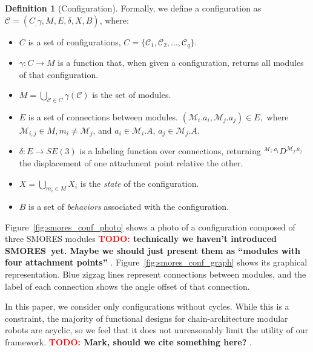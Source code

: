 \documentclass[conference]{IEEEtran}
\theoremstyle{definition}
\newtheorem{definition}{Definition}[section]
\newcommand{\TODO}[1]{ {\bf \textcolor{red}{TODO:} #1 }}
\begin{document}
\begin{definition}[Configuration]
Formally, we define a configuration as $\mathcal{C}=(C_, \gamma, M, E, \delta,
X, B)$, where:
\begin{itemize}
\item $C$ is a set of configurations, $C=\{\mathcal{C}_{1}, \mathcal{C}_{2}, ..., \mathcal{C}_{q}\}$.
\item $\gamma: C \rightarrow M$ is a function that, when given a configuration, returns all modules of that configuration.
\item \( M=\bigcup_{\mathcal{C}\in C}{\gamma(\mathcal{C})} \) is the set of modules.
\item $E$ is a set of connections between modules. $(\mathcal{M}_i.a_i, \mathcal{M}_j.a_j)\in E,$ where $\mathcal{M}_{i,j} \in M, m_i \neq \mathcal{M}_j$, and $a_i\in \mathcal{M}_i.A$, $a_j\in \mathcal{M}_j.A$.
\item $\delta: E \rightarrow SE(3)$ is a labeling function over connections, returning
\({^{\mathcal{M}_i.a_i}}D^{\mathcal{M}_j.a_j}\) the displacement of one attachment point relative the
other. \item \(X = \displaystyle\bigcup_{m_i \in M} X_i \) is the \textit{state} of the configuration.
\item \(B\) is a set of \textit{behaviors} associated with the configuration.
\end{itemize}

Figure~\ref{fig:smores_conf_photo} shows a photo of a configuration composed
of three SMORES modules \TODO{technically we haven't introduced SMORES\ yet. Maybe
we should just present them as ``modules with four attachment points''}. Figure~\ref{fig:smores_conf_graph} shows its
graphical representation. Blue zigzag lines represent connections between
modules, and the label of each connection shows the angle offset of that
connection.

In this paper, we consider only configurations without cycles. While this is a constraint,
the majority of functional designs for chain-architecture modular robots are acyclic,
so we feel that it does not unreasonably limit the utility of our framework. \TODO{Mark,
should we cite something here?}.   
 

\end{definition}
\end{document}

